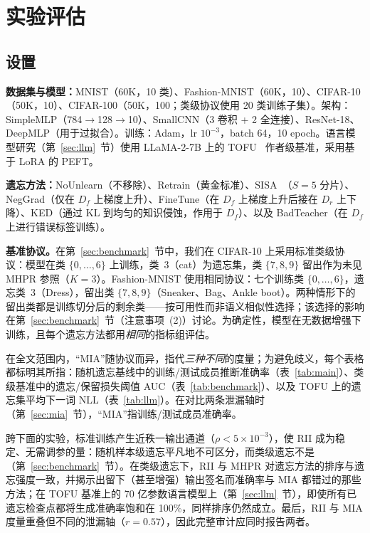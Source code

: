 
\section{实验评估}
\label{sec:experiments}

\subsection{设置}

\textbf{数据集与模型：}MNIST（60K，10 类）、Fashion-MNIST（60K，10）、CIFAR-10（50K，10）、CIFAR-100（50K，100；类级协议使用 20 类训练子集）。架构：SimpleMLP（784$\to$128$\to$10）、SmallCNN（3 卷积 + 2 全连接）、ResNet-18、DeepMLP（用于过拟合）。训练：Adam，lr $10^{-3}$，batch 64，10 epoch。语言模型研究（第~\ref{sec:llm}~节）使用 LLaMA-2-7B 上的 TOFU~\cite{maini2024tofu} 作者级基准，采用基于 LoRA 的 PEFT。

\textbf{遗忘方法：}NoUnlearn（不移除）、Retrain（黄金标准）、SISA~\cite{bourtoule2021machine}（$S{=}5$ 分片）、NegGrad（仅在 $D_f$ 上梯度上升）、FineTune（在 $D_f$ 上梯度上升后接在 $D_r$ 上下降）、KED（通过 KL 到均匀的知识侵蚀，作用于 $D_f$）、以及 BadTeacher（在 $D_f$ 上进行错误标签训练）。

\textbf{基准协议。}在第~\ref{sec:benchmark}~节中，我们在 CIFAR-10 上采用标准类级协议：模型在类 $\{0,\dots,6\}$ 上训练，类~3（cat）为遗忘集，类 $\{7,8,9\}$ 留出作为未见 MHPR 参照（$K{=}3$）。Fashion-MNIST 使用相同协议：七个训练类 $\{0,\dots,6\}$，遗忘类~3（Dress），留出类 $\{7,8,9\}$（Sneaker、Bag、Ankle boot）。两种情形下的留出类都是训练切分后的剩余类——按可用性而非语义相似性选择；该选择的影响在第~\ref{sec:benchmark}~节（注意事项~(2)）讨论。为确定性，模型在无数据增强下训练，且每个遗忘方法都用\emph{相同}的指标组评估。

在全文范围内，``MIA''随协议而异，指代\emph{三种不同}的度量；为避免歧义，每个表格都标明其所指：随机遗忘基线中的训练/测试成员推断准确率（表~\ref{tab:main}）、类级基准中的遗忘/保留损失阈值 AUC（表~\ref{tab:benchmark}）、以及 TOFU 上的遗忘集平均下一词 NLL（表~\ref{tab:llm}）。在对比两条泄漏轴时（第~\ref{sec:mia}~节），``MIA''指训练/测试成员准确率。

跨下面的实验，标准训练产生近秩一输出通道（$\rho<5\times10^{-3}$），使 RII 成为稳定、无需调参的量：随机样本级遗忘平凡地不可区分，而类级遗忘不是（第~\ref{sec:benchmark}~节）。在类级遗忘下，RII 与 MHPR 对遗忘方法的排序与遗忘强度一致，并揭示出留下（甚至增强）输出签名而准确率与 MIA 都错过的那些方法；在 TOFU 基准上的 70 亿参数语言模型上（第~\ref{sec:llm}~节），即使所有已遗忘检查点都将生成准确率饱和在 100\%，同样排序仍然成立。最后，RII 与 MIA 度量重叠但不同的泄漏轴（$r{=}0.57$），因此完整审计应同时报告两者。

